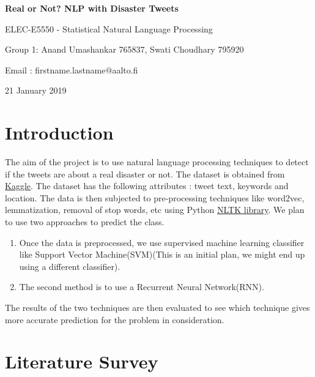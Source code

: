 \documentclass{article}
\begin{document}
\begin{titlepage}
 \begin{center}
  \vspace*{1cm}
  \begin{huge}
   \textbf{Real or Not? NLP with Disaster Tweets}
  \end{huge}


  \vspace{0.5cm}
  ELEC-E5550 - Statistical Natural Language Processing

  \vspace{1.5cm}
  Group 1: Anand Umashankar 765837, Swati Choudhary 795920

  \vspace{0.5cm}
  Email : firstname.lastname@aalto.fi

  \vspace{0.5cm}
  21 January 2019
 \end{center}
\end{titlepage}



\section{Introduction}
The aim of the project is to use natural language processing techniques to detect if the tweets are about a real disaster or not. The dataset is obtained from  \href{https://www.kaggle.com/c/nlp-getting-started/overview/description}{Kaggle}. The dataset has the following attributes : tweet text, keywords and location. The data is then subjected to  pre-processing techniques like word2vec, lemmatization, removal of stop words, etc using Python \href{https://www.nltk.org/}{NLTK library}. We plan to use two approaches to predict the class.

\begin{enumerate}
 \item Once the data is preprocessed, we use supervised machine learning classifier like Support Vector Machine(SVM)(This is an initial plan, we might end up using a different classifier).
 \item The second method is to use a Recurrent Neural Network(RNN).
\end{enumerate}
The results of the two techniques are then evaluated to see which technique gives more accurate prediction for the problem in consideration.

\section{Literature Survey}
\end{document}
